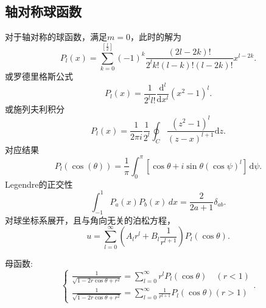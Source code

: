 \documentclass[12pt,a4paper,openany,twoside]{book}
\numberwithin{equation}{section}
\begin{document}
        \subsection{轴对称球函数}
          对于轴对称的球函数，满足$ m = 0 $，此时的解为
          \begin{equation}
            P_l (x) = \sum_{k=0} ^{[\frac{l}{2} ]} (-1)^k \frac{(2l-2k)!}{2^l k! (l-k)! (l-2k)!} x^{l-2k}
          .
          \end{equation} 
          或罗德里格斯公式
          \begin{equation}
            P_l(x) = \frac{1}{2^l l!} \frac{\mathrm{d} ^l}{\mathrm{d} x^l} (x^2 -1 )^l
          .
          \end{equation} 
          或施列夫利积分
          \begin{equation}
            P_l(x) = \frac{1}{2\pi i} \frac{1}{2^l } \oint_C \frac{(z^2-1)^l}{(z-x)^{l+1}} \mathrm{d}z
          .
          \end{equation} 
          对应结果
          \begin{equation}
            P_l(\cos(\theta)) = \frac{1}{\pi} \int _0^\pi [\cos{\theta} + i \sin{\theta}(\cos{\psi})^l] \, \mathrm{d}\psi 
          .
          \end{equation} 
          Legendre的正交性
          \begin{equation}
            \int _{-1}^1 P_a(x) P_b(x) \, dx = \frac{2}{2a+1} \delta_{ab} 
          .
          \end{equation} 
          对球坐标系展开，且与角向无关的泊松方程，
          \begin{equation}
            u = \sum_{l=0} ^ \infty \left( A_l r^l + B_l \frac{1}{r^{l+1}}  \right) P_l (\cos{\theta})
          .
          \end{equation} 

          母函数:
          \begin{equation}
            \begin{cases}
              \frac{1}{\sqrt{1-2r\cos{\theta} + r^2}} = \sum _{l=0}^\infty r^l P_l (\cos{\theta}) \quad (r<1)\\
              \frac{1}{\sqrt{1-2r\cos{\theta} + r^2}} = \sum _{l=0} ^{\infty} \frac{1}{r^{l+1}} P_l (\cos{\theta}) (r>1)
              \end{cases}
          .
          \end{equation} 
\end{document}
